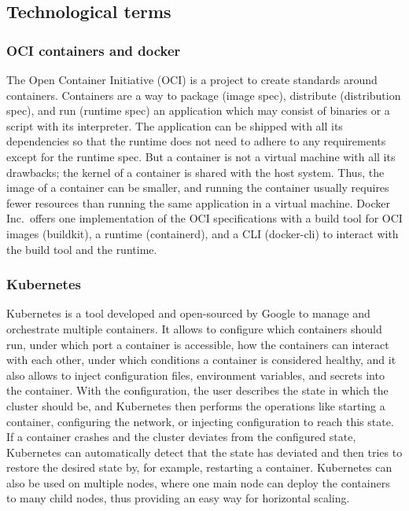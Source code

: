 \documentclass[conference]{IEEEtran}
\begin{document}
\subsection{Technological terms}

\subsubsection{OCI containers and docker}

The Open Container Initiative (OCI) is a project to create standards around containers\cite{oci-website}.
Containers are a way to package (image spec), distribute (distribution spec), and run (runtime spec) an application
which may consist of binaries or a script with its interpreter.
The application can be shipped with all its dependencies so that the runtime does not need to adhere to any
requirements except for the runtime spec.
But a container is not a virtual machine with all its drawbacks; the kernel of a container is shared with the host system.
Thus, the image of a container can be smaller, and running the container usually requires fewer resources than running the same application
in a virtual machine.
Docker Inc.\ offers one implementation of the OCI specifications with a build tool for OCI images (buildkit), a runtime (containerd),
and a CLI (docker-cli) to interact with the build tool and the runtime\cite{docker-container-runtime-website}.

\subsubsection{Kubernetes}

Kubernetes is a tool developed and open-sourced by Google to manage and orchestrate multiple containers\cite{kubernetes-docs}.
It allows to configure which containers should run, under which port a container is accessible,
how the containers can interact with each other, under which conditions a container is considered healthy, and it also allows
to inject configuration files, environment variables, and secrets into the container\cite{kubernetes-docs}.
With the configuration, the user describes the state in which the cluster should be, and Kubernetes then performs the
operations like starting a container, configuring the network, or injecting configuration to reach this state\cite{kubernetes-docs}.
If a container crashes and the cluster deviates from the configured state, Kubernetes can automatically detect that
the state has deviated and then tries to restore the desired state by, for example, restarting a container\cite{kubernetes-docs}.
Kubernetes can also be used on multiple nodes, where one main node can deploy the containers to many child nodes,
thus providing an easy way for horizontal scaling\cite{kubernetes-docs}.
\end{document}

